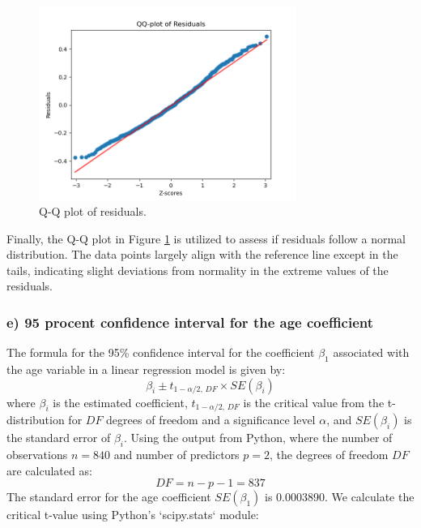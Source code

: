 \documentclass{rapport}
\begin{document}
\begin{figure}[H]
    \centering
    \includegraphics[width=0.75\textwidth]{qq_plot_resid.png}
    \caption{\small Q-Q plot of residuals.}
    \label{fig:qq_plot}
\end{figure}

\noindent
Finally, the Q-Q plot in Figure \ref{fig:qq_plot} is utilized to assess if residuals follow a normal distribution. The data points largely align with the reference line except in the tails, indicating slight deviations from normality in the extreme values of the residuals.






\subsubsection*{\textbf{e)} 95 procent confidence interval for the age coefficient}
\noindent
The formula for the 95\% confidence interval for the coefficient \( \beta_1 \) associated with the age variable in a linear regression model is given by:
\[
\beta_i \pm t_{1-\alpha/2, \, DF} \times SE(\beta_i)
\]
where \( \beta_i \) is the estimated coefficient, \( t_{1-\alpha/2, \, DF} \) is the critical value from the t-distribution for \( DF \) degrees of freedom and a significance level \( \alpha \), and \( SE(\beta_i) \) is the standard error of \( \beta_i \).
\noindent
Using the output from Python, where the number of observations \( n = 840 \) and number of predictors \( p = 2 \), the degrees of freedom \( DF \) are calculated as:
\[
DF = n - p - 1 = 837
\]
\noindent
The standard error for the age coefficient \( SE(\beta_1) \) is 0.0003890. We calculate the critical t-value using Python's `scipy.stats` module:
\end{document}
